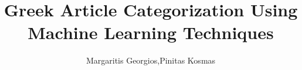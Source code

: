 \documentclass[10pt,journal,compsoc]{IEEEtran}
\begin{document}
%
\title{Greek Article Categorization Using Machine Learning Techniques}
%
%
%
%

\author{Margaritis Georgios,Pinitas Kosmas%
}
\end{document}
